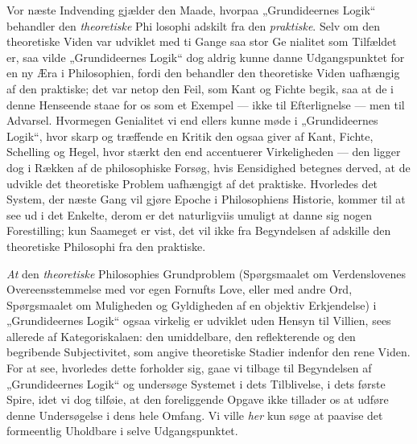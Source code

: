 \documentclass[12pt,a4paper]{book}
\newcommand{\opage}[1]{\marginnote{\footnotesize\textit{[#1]}}}
\begin{document}
\opage{55}\setcounter{footnote}{0}%
Vor næste Indvending gjælder den Maade, hvorpaa
„Grundideernes Logik“ behandler den \emph{theoretiske} Phi%
\opage{56}\setcounter{footnote}{0}%
losophi adskilt fra den \emph{praktiske}. Selv om den theoretiske
Viden var udviklet med ti Gange saa stor Ge%
\opage{57}\setcounter{footnote}{0}%
nialitet som Tilfældet er, saa vilde „Grundideernes
Logik“ dog aldrig kunne danne Udgangspunktet for en ny
Æra i Philosophien, fordi den behandler den theoretiske
Viden uafhængig af den praktiske; det var netop den
Feil, som Kant og Fichte begik, saa at de i denne Henseende
staae for os som et Exempel --- ikke til Efterlignelse
--- men til Advarsel. Hvormegen Genialitet
vi end ellers kunne møde i „Grundideernes Logik“,
hvor skarp og træffende en Kritik den ogsaa giver af
Kant, Fichte, Schelling og Hegel, hvor stærkt den end
accentuerer Virkeligheden --- den ligger dog i Rækken
af de philosophiske Forsøg, hvis Eensidighed betegnes
derved, at de udvikle det theoretiske Problem uafhængigt
af det praktiske. Hvorledes det System, der næste Gang
vil gjøre Epoche i Philosophiens Historie, kommer til
at see ud i det Enkelte, derom er det naturligviis umuligt
at danne sig nogen Forestilling; kun Saameget er
\opage{58}\setcounter{footnote}{0}%
vist, det vil ikke fra Begyndelsen af adskille den theoretiske
Philosophi fra den praktiske.

\emph{At} den \emph{theoretiske} Philosophies Grundproblem
(Spørgsmaalet om Verdenslovenes Overeensstemmelse
med vor egen Fornufts Love, eller med andre Ord,
Spørgsmaalet om Muligheden og Gyldigheden af en
objektiv Erkjendelse) i „Grundideernes Logik“ ogsaa virkelig
er udviklet uden Hensyn til Villien, sees allerede
af Kategoriskalaen: den umiddelbare, den reflekterende
og den begribende Subjectivitet, som angive theoretiske
Stadier indenfor den rene Viden. For at see, hvorledes
dette forholder sig, gaae vi tilbage til Begyndelsen
af „Grundideernes Logik“ og undersøge Systemet i
dets Tilblivelse, i dets første Spire, idet vi dog tilføie,
at den foreliggende Opgave ikke tillader os at udføre
denne Undersøgelse i dens hele Omfang. Vi ville \emph{her}
kun søge at paavise det formeentlig Uholdbare i selve
Udgangspunktet.
\end{document}
